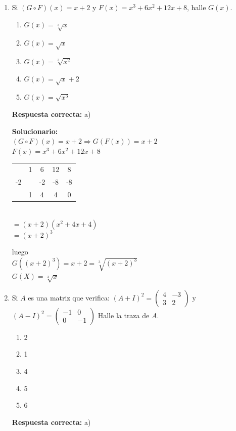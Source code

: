 \begin{enumerate}
	
	\item Si $(G \circ F)(x) = x + 2$ y $F(x) = x^3 + 6x^2 + 12x + 8$, halle $G(x)$.
	\begin{enumerate}[label=\alph*)]
		\item $G(x) = \sqrt[3]{x}$
		\item $G(x) = \sqrt{x}$
		\item $G(x) = \sqrt[3]{x^2}$
		\item $G(x) = \sqrt{x} + 2$
		\item $G(x) = \sqrt{x^3}$
	\end{enumerate}
	\textbf{Respuesta correcta:} a)
	
	\vspace{2mm}
	\textbf{Solucionario:}\\
	$(G \circ F)(x) = x + 2 \Rightarrow G(F(x)) = x + 2$\\
	$F(x) = x^3 + 6x^2 + 12x + 8$
	\hfill
	\begin{tabular}{c|cccc}
		& 1 & 6 & 12 & 8 \\
		-2 & & -2 & -8 & -8 \\
		\hline
		& 1 & 4 & 4 & 0
	\end{tabular}\\
	$= (x + 2)(x^2 + 4x + 4)$\\
	$= (x + 2)^3$
	
	luego\\
	$G((x + 2)^3) = x + 2 = \sqrt[3]{(x + 2)^3}$\\
	$G(X) = \sqrt[3]{x}$
	
	\vspace{6mm}
	
	\item Si $A$ es una matriz que verifica:
	$(A + I)^2 = \begin{pmatrix} 4 & -3 \\ 3 & 2 \end{pmatrix}$ y $(A - I)^2 = \begin{pmatrix} -1 & 0 \\ 0 & -1 \end{pmatrix}$
	Halle la traza de $A$.
	\begin{enumerate}[label=\alph*)]
		\item 2
		\item 1
		\item 4
		\item 5
		\item 6
	\end{enumerate}
	\textbf{Respuesta correcta:} a)
	

\end{enumerate}
